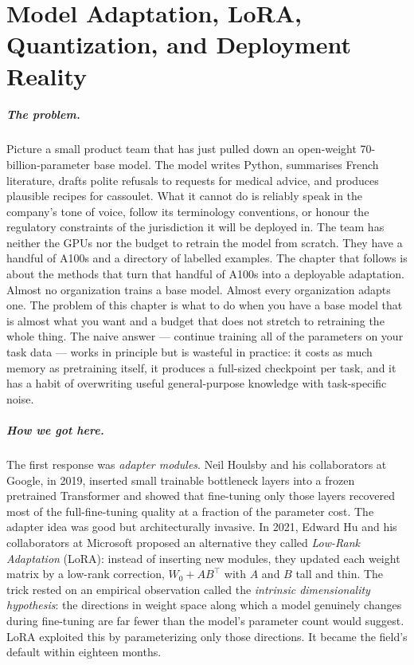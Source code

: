 \chapter{Model Adaptation, LoRA, Quantization, and Deployment Reality}
\label{chap:adaptation}

\scenelabel
\begin{scenestrip}
\end{scenestrip}

\paragraph{The problem.}
Picture a small product team that has just pulled down an
open-weight 70-billion-parameter base model. The model writes
Python, summarises French literature, drafts polite refusals to
requests for medical advice, and produces plausible recipes for
cassoulet. What it cannot do is reliably speak in the company's
tone of voice, follow its terminology conventions, or honour the
regulatory constraints of the jurisdiction it will be deployed in.
The team has neither the GPUs nor the budget to retrain the model
from scratch. They have a handful of A100s and a directory of
labelled examples. The chapter that follows is about the methods
that turn that handful of A100s into a deployable adaptation.
Almost no organization trains a base model. Almost every
organization adapts one. The problem of this
chapter is what to do when you have a base model that is almost what
you want and a budget that does not stretch to retraining the whole
thing. The naive answer --- continue training all of the parameters
on your task data --- works in principle but is wasteful in
practice: it costs as much memory as pretraining itself, it produces
a full-sized checkpoint per task, and it has a habit of overwriting
useful general-purpose knowledge with task-specific noise.

\paragraph{How we got here.}
The first response was \emph{adapter modules}. Neil Houlsby and his
collaborators at Google, in 2019, inserted small trainable
bottleneck layers into a frozen pretrained Transformer and showed
that fine-tuning only those layers recovered most of the
full-fine-tuning quality at a fraction of the parameter cost. The
adapter idea was good but architecturally invasive. In 2021, Edward
Hu and his collaborators at Microsoft proposed an alternative they
called \emph{Low-Rank Adaptation} (LoRA): instead of inserting new
modules, they updated each weight matrix by a low-rank correction,
$W_0 + AB^\top$ with $A$ and $B$ tall and thin. The trick rested on
an empirical observation called the \emph{intrinsic dimensionality
hypothesis}: the directions in weight space along which a model
genuinely changes during fine-tuning are far fewer than the model's
parameter count would suggest. LoRA exploited this by parameterizing
only those directions. It became the field's default within
eighteen months.

